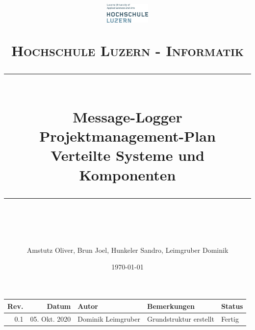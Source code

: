 \documentclass[11pt]{scrartcl} %
\title{	
	\begin{figure}[h]
		\begin{flushright}
			\includegraphics[width=0.2\textwidth]{Bilder/hsluLogo.eps}			
		\end{flushright}
	\end{figure}
	\vspace{10pt} %
	\normalfont\normalsize
	\textsc{Hochschule Luzern - Informatik}
	\vspace{12pt} %
	\rule{\linewidth}{0.5pt}\\ %
	{\huge Message-Logger}\\
	{\huge Projektmanagement-Plan}\\ %
	\vspace{10pt} %
	{\large Verteilte Systeme und Komponenten }
	\vspace{12pt} %
	\rule{\linewidth}{2pt}\\ %
	\vspace{12pt} %
}
\author{\Large Amstutz Oliver, Brun Joel, Hunkeler Sandro, Leimgruber Dominik} %
\date{\normalsize\today} %
\begin{document}
	\maketitle %
	\pagestyle{fancy}
	\thispagestyle{empty}
	\setcounter{page}{0}
	\newpage
	\begin{center}
		\begin{tabularx}{\textwidth}{|r|r|l|X|l|}
			\hline
			\textbf{Rev.} & \textbf{Datum} & \textbf{Autor} & \textbf{Bemerkungen} & \textbf{Status}  \\ 
			\hline
			0.1 & 05. Okt. 2020 & Dominik Leimgruber & Grundstruktur erstellt & Fertig \\
		
			\hline
		\end{tabularx}
	\end{center}
	\listoffigures
	\listoftables
	\newpage
	\tableofcontents

\newpage








%


\end{document}
